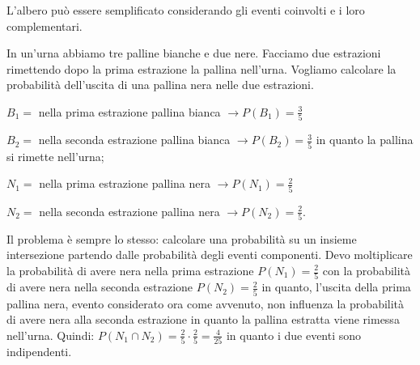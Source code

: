 L'albero può essere semplificato considerando gli eventi coinvolti e i loro 
complementari.

\begin{esempio}
In un'urna abbiamo tre palline bianche e due nere. Facciamo due estrazioni 
rimettendo dopo la prima estrazione la pallina nell'urna. Vogliamo calcolare 
la 
probabilità dell'uscita di una pallina nera nelle due estrazioni.
\begin{itemize*}
\item $ B_{1}= $ nella prima estrazione pallina bianca $\to P(B_1)=\frac 3 5$
\item $ B_{2}= $ nella seconda estrazione pallina bianca $\to P(B_2)=\frac 3 
5$ 
in quanto la pallina si rimette nell'urna;
\item $ N_{1}= $ nella prima estrazione pallina nera $\to P(N_1)=\frac 2 5$
\item $ N_{2}= $ nella seconda estrazione pallina nera $\to P(N_2)=\frac 2 5$.
\end{itemize*}
Il problema è sempre lo stesso: calcolare una probabilità su un insieme 
intersezione partendo dalle probabilità degli eventi componenti. Devo 
moltiplicare la probabilità di avere nera nella prima estrazione 
$P(N_1)=\frac 
2 
5$ con la probabilità di avere nera nella seconda estrazione $P(N_2)=\frac 2 
5$ 
in quanto, l'uscita della prima pallina nera, evento considerato ora come 
avvenuto, non influenza la probabilità di avere nera alla seconda estrazione 
in 
quanto la pallina estratta viene rimessa nell'urna. Quindi: $P(N_1\cap 
N_2)=\frac 2 5\cdot \frac 2 5=\frac 4{25}$ in quanto i due eventi sono 
indipendenti.

\begin{center}
\end{center}
\end{esempio}
